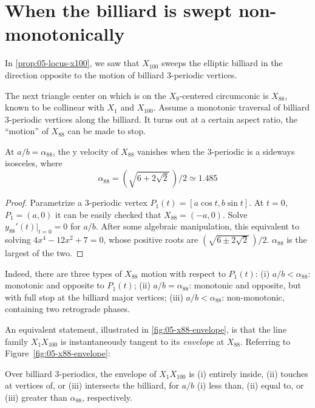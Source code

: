 \section{When the billiard is swept non-monotonically}
\label{sec:05-non-monotonic}

In \cref{prop:05-locus-x100}, we saw that $X_{100}$ sweeps the elliptic billiard in the direction opposite to the motion of billiard 3-periodic vertices.

The next triangle center on \cite{etc} which is on the $X_9$-centered circumconic is $X_{88}$, known to be collinear with $X_1$ and $X_{100}$. Assume a monotonic traversal of billiard 3-periodic vertices along the billiard. It turns out at a certain aspect ratio, the ``motion'' of $X_{88}$ can be made to stop. 

\begin{proposition}
At $a/b=\alpha_{88}$, the y velocity of $X_{88}$ vanishes when the 3-periodic is a sideways isosceles, where 
\[\alpha_{88}=(\sqrt{6+2\sqrt{2}}\,)/2\simeq{1.485} \]
\end{proposition}

\begin{proof}
Parametrize a 3-periodic vertex $P_1(t)=[a \cos{t},b \sin{t}]$. At $t=0$, $P_1=(a,0)$ it can be easily checked that $X_{88}=(-a,0)$. Solve $y_{88}'(t)|_{t=0}=0$ for $a/b$. After some algebraic manipulation, this equivalent to solving $4x^4-12x^2+7=0$, whose positive roots are $(\sqrt{6\pm 2\sqrt{2}}\,)/2$. $\alpha_{88} $ is the largest of the two.
\end{proof}

Indeed, there are three types of $X_{88}$ motion with respect to $P_1(t)$: (i) $a/b<\alpha_{88}$: monotonic and opposite to $P_1(t)$; (ii) $a/b=\alpha_{88}$: monotonic and opposite, but with full stop at the billiard major vertices; (iii) $a/b<\alpha_{88}$: non-monotonic, containing two retrograde phases.

An equivalent statement, illustrated in \cref{fig:05-x88-envelope}, is that the line family $X_1 X_{100}$ is instantaneously tangent to its {\em envelope} at $X_{88}$. Referring to Figure~\ref{fig:05-x88-envelope}:

\begin{proposition}
Over billiard 3-periodics, the envelope of $X_1 X_{100}$ is (i) entirely inside, (ii) touches at vertices of, or (iii) intersects the billiard, for $a/b$ (i) less than, (ii) equal to, or (iii) greater than $\alpha_{88}$, respectively. 
\label{prop:05-x88-env}
\end{proposition}

